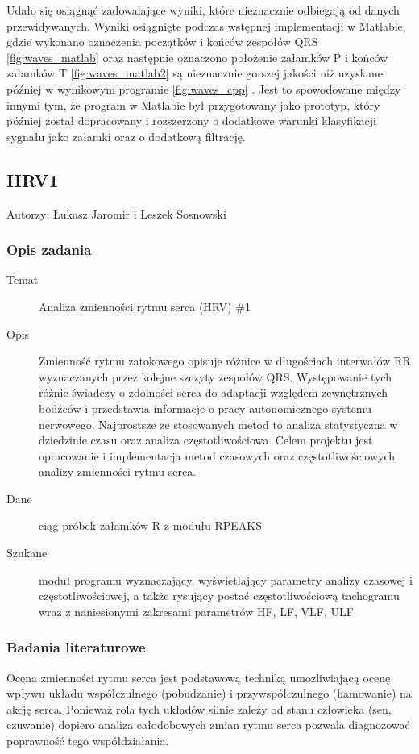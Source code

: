 \documentclass[a4paper, 11pt]{article}
\begin{document}
Udało się osiągnąć zadowalające wyniki, które nieznacznie odbiegają od danych przewidywanych. 
Wyniki osiągnięte podczas wstępnej implementacji w Matlabie, gdzie wykonano oznaczenia początków i końców zespołów QRS \ref{fig:waves_matlab} oraz następnie oznaczono położenie załamków P i końców załamków T \ref{fig:waves_matlab2} są nieznacznie gorszej jakości niż uzyskane później w wynikowym programie \ref{fig:waves_cpp} . Jest to spowodowane między innymi tym, że program w Matlabie był przygotowany jako prototyp, który później został dopracowany i rozszerzony o dodatkowe warunki klasyfikacji sygnału jako załamki oraz o dodatkową filtrację.

\subsection{HRV1}
\label{sec:hrv1}

Autorzy: Łukasz Jaromir i Leszek Sosnowski
\subsubsection{Opis zadania}
\label{sec:hrv1:desc}
\begin{description}
\item[Temat] Analiza zmienności rytmu serca (HRV) \#1
\item[Opis] Zmienność rytmu zatokowego opisuje różnice w długościach interwałów RR
wyznaczanych przez kolejne szczyty zespołów QRS. Występowanie tych różnic świadczy
o zdolności serca do adaptacji względem zewnętrznych bodźców i przedstawia informacje
o pracy autonomicznego systemu nerwowego. Najprostsze ze stosowanych metod to analiza
statystyczna w dziedzinie czasu oraz analiza częstotliwościowa. Celem projektu jest
opracowanie i implementacja metod czasowych oraz częstotliwościowych analizy zmienności
rytmu serca.
\item[Dane] ciąg próbek załamków R z modułu RPEAKS
\item[Szukane] moduł programu wyznaczający, wyświetlający parametry analizy czasowej
i częstotliwościowej, a także rysujący postać częstotliwościową tachogramu wraz
z naniesionymi zakresami parametrów HF, LF, VLF, ULF
\end{description}

\subsubsection{Badania literaturowe}
\label{sec:hrv1:papers}
Ocena zmienności rytmu serca jest podstawową techniką umozliwiającą ocenę wpływu układu współczulnego (pobudzanie) i przywspółczulnego (hamowanie) na akcję serca. Ponieważ rola tych układów silnie zależy od stanu człowieka (sen, czuwanie) dopiero analiza całodobowych zmian rytmu serca pozwala diagnozować poprawność tego współdziałania.
\end{document}
